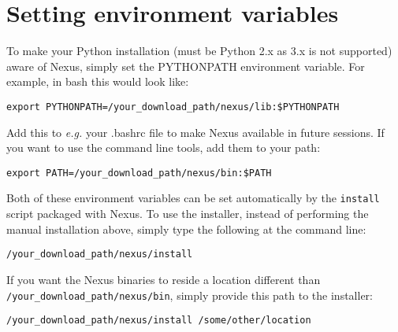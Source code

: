 \documentclass[oneside,11pt]{memoir}
\numberwithin{equation}{section}
\begin{document}


\section{Setting environment variables}
To make your Python installation (must be Python 2.x as 3.x is not supported) 
aware of Nexus, simply set the PYTHONPATH environment variable.  For example, in bash this would look like:
\begin{shaded}
\begin{verbatim}
export PYTHONPATH=/your_download_path/nexus/lib:$PYTHONPATH
\end{verbatim}
\end{shaded}
\noindent
Add this to \emph{e.g.} your .bashrc file to make Nexus available 
in future sessions.
If you want to use the command line tools, add them to your path:
\begin{shaded}
\begin{verbatim}
export PATH=/your_download_path/nexus/bin:$PATH
\end{verbatim}
\end{shaded}

Both of these environment variables can be set automatically by the \texttt{install} script packaged with Nexus.  To use the installer, instead of performing the manual installation above, simply type the following at the command line:
\begin{shaded}
\begin{verbatim}
/your_download_path/nexus/install
\end{verbatim}
\end{shaded}
\noindent
If you want the Nexus binaries to reside a location different than \texttt{/your\_download\_path/nexus/bin}, simply provide this path to the installer:
\begin{shaded}
\begin{verbatim}
/your_download_path/nexus/install /some/other/location
\end{verbatim}
\end{shaded}
\end{document}
